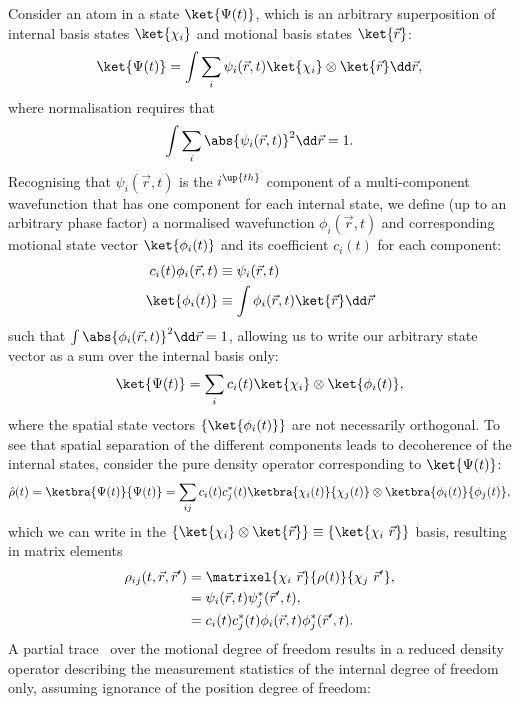 Consider an atom in a state $\ket{\Psi(t)}$, which is an arbitrary superposition of internal basis states $\ket{\chi_i}$ and motional basis states $\ket{\vec r}$: 
\begin{align}
\ket{\Psi(t)} = \int \sum_i \psi_i(\vec r, t) \ket{\chi_i}\otimes\ket{\vec r} \dd\vec r,
\end{align}
where normalisation requires that
\begin{align}
\int \sum_i \abs{\psi_i(\vec r, t)}^2 \dd\vec r = 1.
\end{align}
Recognising that $\psi_i(\vec r, t)$ is the $i^\up{th}$ component of a multi-component wavefunction that has one component for each internal state, we define (up to an arbitrary phase factor) a normalised wavefunction $\phi_i(\vec r, t)$ and corresponding motional state vector $\ket{\phi_i(t)}$ and its coefficient $c_i(t)$ for each component:
\begin{align}\label{eq:product_state_vector}
c_i(t)\phi_i(\vec r, t) &\equiv \psi_i(\vec r, t) \\
\ket{\phi_i(t)} &\equiv \int \phi_i(\vec r, t)\ket{\vec r}\dd \vec r
\end{align}
such that $\int\abs{\phi_i(\vec r, t)}^2\dd \vec r = 1$, allowing us to write our arbitrary state vector as a sum over the internal basis only:
\begin{align}
\ket{\Psi(t)} = \sum_i c_i(t) \ket{\chi_i}\otimes\ket{\phi_i(t)},
\end{align}
where the spatial state vectors $\{\ket{\phi_i(t)}\}$ are not necessarily orthogonal. To see that spatial separation of the different components leads to decoherence of the internal states, consider the pure density operator corresponding to $\ket{\Psi(t)}$:
\begin{align}
\hat\rho(t) = \ketbra{\Psi(t)}{\Psi(t)} = \sum_{ij}
c_i(t) c_j^*(t)\ketbra{\chi_i(t)}{\chi_j(t)}\otimes\ketbra{\phi_i(t)}{\phi_j(t)},
\end{align}
which we can write in the $\{\ket{\chi_i}\otimes\ket{\vec r}\} \equiv \{\ket{\chi_i\ \vec r}\} $ basis, resulting in matrix elements
\begin{align}
\rho_{ij}(t, \vec r, \vec r^\prime) &= \matrixel{\chi_i\ \vec r}{\rho(t)}{\chi_j\ \vec r^\prime},\\
&= \psi_i(\vec r, t)\psi_j^*(\vec r^\prime, t),\\
&= c_i(t) c^*_j(t) \phi_i(\vec r, t) \phi_j^*(\vec r^\prime, t).
\end{align}
A partial trace~\cite{schlosshauer_decoherence:_2007} over the motional degree of freedom results in a reduced density operator describing the measurement statistics of the internal degree of freedom only, assuming ignorance of the position degree of freedom:
